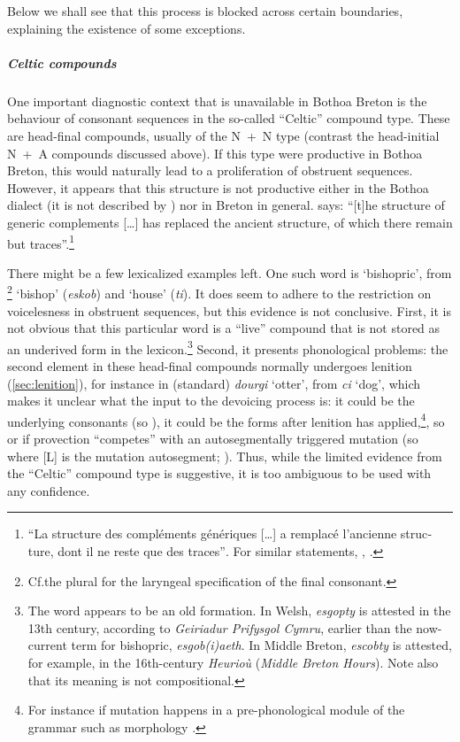 Below we shall see that this process is blocked across certain boundaries, explaining the existence of some exceptions.

\subparagraph{Celtic compounds}
\label{sec:celtic-compounds}

One important diagnostic context that is unavailable in Bothoa Breton is the behaviour of consonant sequences in the so-called \enquote{Celtic} compound type. These are head-final compounds, usually of the N~+~N type (contrast the head-initial N~+~A compounds discussed above). If this type were productive in Bothoa Breton, this would naturally lead to a proliferation of obstruent sequences. However, it appears that this structure is not productive either in the Bothoa dialect (it is not described by \citealp{humphreys95:_phonol_bothoa_saint_nicol_pelem}) nor in Breton in general. \citet[\S195]{favereau01} says: \enquote{[t]he structure of generic complements [\ldots] has replaced the ancient structure, of which there remain but traces}.\footnote{\textfrench{\enquote{La structure des compléments génériques [\ldots] a remplacé l'ancienne structure, dont il ne reste que des traces}}. For similar statements, \cf \citet[\S164]{trepos66:_gramm}, \citet[\S873]{yezhadur}.}

There might be a few lexicalized examples left. One such word is \ipa{[ɛsˈkɔpti]} `bishopric', from \ipa{[ˈɛskɔb̥]}\footnote{Cf.\@ the plural \ipa{[ɛsˈkɔbjən]} for the laryngeal specification of the final consonant.} `bishop' (\emph{eskob}) and \ipa{[ˈtiː]} `house' (\emph{ti}). It does seem to adhere to the restriction on voicelesness in obstruent sequences, but this evidence is not conclusive. First, it is not obvious that this particular word is a \enquote{live} compound that is not stored as an underived form in the lexicon.\footnote{The word appears to be an old formation. In Welsh, \emph{esgopty} is attested in the 13th century, according to \emph{Geiriadur Prifysgol Cymru}, earlier than the now-current term for bishopric, \emph{esgob(i)aeth}. In Middle Breton, \emph{escobty} is attested, for example, in the 16th-century \emph{Heurioù} (\emph{Middle Breton Hours}). Note also that its meaning is not compositional.\label{fn:escobty}} Second, it presents phonological problems: the second element in these head-final compounds normally undergoes lenition (\cref{sec:lenition}), for instance in (standard) \emph{dourgi} `otter', from \emph{ci} `dog', which makes it unclear what the input to the devoicing process is: it could be the underlying consonants (so ), it could be the forms after lenition has applied,\footnote{For instance if mutation happens in a pre-phonological module of the grammar such as morphology \citep{stewart,green2003,greenbook}.}, so  or if provection \enquote{competes} with an autosegmentally triggered mutation (so  where [L] is the mutation autosegment; \citealp{hamp,lieber,lieberbook,swingle,wolf-forautosegs}). Thus, while the limited evidence from the \enquote{Celtic} compound type is suggestive, it is too ambiguous to be used with any confidence.


